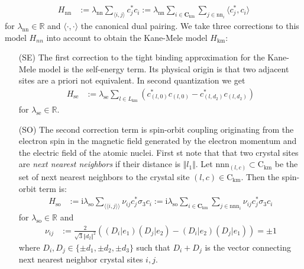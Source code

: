 \begin{align*}
  H_{\textrm{nn}}
  &:=
  \lambda_{\textrm{nn}}
  \sum_{\langle i,j \rangle}
  c_{j}^{\ast}
  c_{i}
  :=
  \lambda_{\textrm{nn}}
  \sum_{i \in \mathbf{C}_{\textrm{km}}}
  \sum_{j \in \textrm{nn}_{i}}
  \langle
    c_{j}^{\ast},c_{i}
  \rangle
\end{align*}
for $\lambda_{\textrm{nn}} \in \mathbb{R}$ and $\langle \cdot,\cdot \rangle$ the canonical dual pairing. We take three corrections to this model $H_{nn}$ into account to obtain the Kane-Mele model $H_{\textrm{km}}$:
\begin{enumerate}
\item[(SE)]
  The first correction to the tight binding approximation for the Kane-Mele model is the self-energy term. Its physical origin is that two adjacent sites are a priori not equivalent. In second quantization we get
\begin{align*}
  H_{\textrm{se}}
  &:=
  \lambda_{\textrm{se}}
  \sum_{l \in L_{\textrm{km}}}
  \left(
    c_{(l,0)}^{\ast}
    c_{(l,0)}
    -
    c_{(l,d_{2})}^{\ast}
    c_{(l,d_{2})}
  \right)
\end{align*}
for $\lambda_{\textrm{se}} \in \mathbb{R}$.
\item[(SO)]
  The second correction term is spin-orbit coupling originating from the electron spin in the magnetic field generated by the electron momentum and the electric field of the atomic nuclei. First st note that that two crystal sites are \textit{next nearest neighbors} if their distance is $\Vert l_{1} \Vert$. Let $\textrm{nnn}_{(l,c)} \subset \mathrm{C}_{\textrm{km}}$ be the set of next nearest neighbors to the crystal site $(l,c) \in \mathrm{C}_{\textrm{km}}$. Then the spin-orbit term is:
\begin{align*}
  H_{\textrm{so}}
  &:=
  \mathrm{i}
  \lambda_{\textrm{so}}
  \sum_{\langle\langle i,j \rangle\rangle}
  \nu_{ij}
  c_{j}^{\ast}
  \sigma_{3}
  c_{i}
  :=
  \mathrm{i}
  \lambda_{\textrm{so}}
  \sum_{i \in \mathbf{C}_{\textrm{km}}}
  \sum_{j \in \textrm{nnn}_{i}}
  \nu_{ij}
  c_{j}^{\ast}
  \sigma_{3}
  c_{i}
\end{align*}
for $\lambda_{\textrm{so}} \in \mathbb{R}$ and
\begin{align*}
  \nu_{ij}
  &:=
  \frac{2}{\sqrt{3}\Vert d_{2} \Vert^{2}}
  \left(
    (D_{i} \vert e_{1})
    (D_{j} \vert e_{2})
    -
    (D_{i} \vert e_{2})
    (D_{j} \vert e_{1})
  \right)
  =
  \pm
  1
\end{align*}
where $D_{i},D_{j} \in \lbrace \pm d_{1},\pm d_{2},\pm d_{3} \rbrace$ such that $D_{i} + D_{j}$ is the vector connecting next nearest neighbor crystal sites $i,j$.

\end{enumerate}
